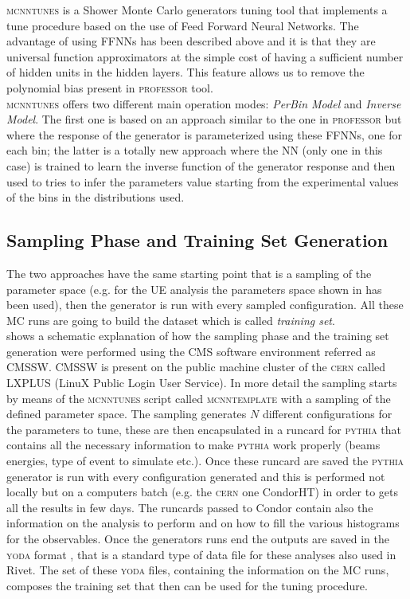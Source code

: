\textsc{mcnntunes} \cite{MCNNTUNESarticle} is a Shower Monte Carlo generators tuning tool that implements a tune procedure based on the use of Feed Forward Neural Networks. The advantage of using FFNNs has been described above and it is that they are universal function approximators at the simple cost of having a sufficient number of hidden units in the hidden layers. This feature allows us to remove the polynomial bias present in \textsc{professor} tool.
\\
\textsc{mcnntunes} offers two different main operation modes: \textit{PerBin Model} and \textit{Inverse Model}. The first one is based on an approach similar to the one in \textsc{professor} but where the response of the generator is parameterized using these FFNNs, one for each bin; the latter is a totally new approach where the NN (only one in this case) is trained to learn the inverse function of the generator response and then used to tries to infer the parameters value starting from the experimental values of the bins in the distributions used.
\\

\medskip

\subsection{Sampling Phase and Training Set Generation}

The two approaches have the same starting point that is a sampling of the parameter space (e.g. for the UE analysis the parameters space shown in  has been used), then the generator is run with every sampled configuration. 
All these MC runs are going to build the dataset which is called \textit{training set}.
\\
 shows a schematic explanation of how the sampling phase and the training set generation were performed using the CMS software environment referred as CMSSW. CMSSW is present on the public machine cluster of the \textsc{cern} called LXPLUS (LinuX Public Login User Service). 
In more detail the sampling starts by means of the  \textsc{mcnntunes} script called \textsc{mcnntemplate} with a sampling of the defined parameter space. The sampling generates  $N$ different configurations for the parameters to tune, these are then encapsulated in a runcard for \textsc{pythia} that contains all the necessary information to make \textsc{pythia} work properly (beams energies, type of event to simulate etc.). Once these runcard are saved the \textsc{pythia} generator is run with every configuration generated and this is performed not locally but on a computers batch (e.g. the \textsc{cern} one CondorHT) in order to gets all the results in few days. The runcards passed to Condor contain also the information on the analysis to perform and on how to fill the various histograms for the observables. Once the generators runs end the outputs are saved in the \textsc{yoda} format \cite{YODA}, that is a standard type of data file for these analyses also used in Rivet. The set of these \textsc{yoda} files, containing the information on the MC runs, composes the training set that then can be used for the tuning procedure.

